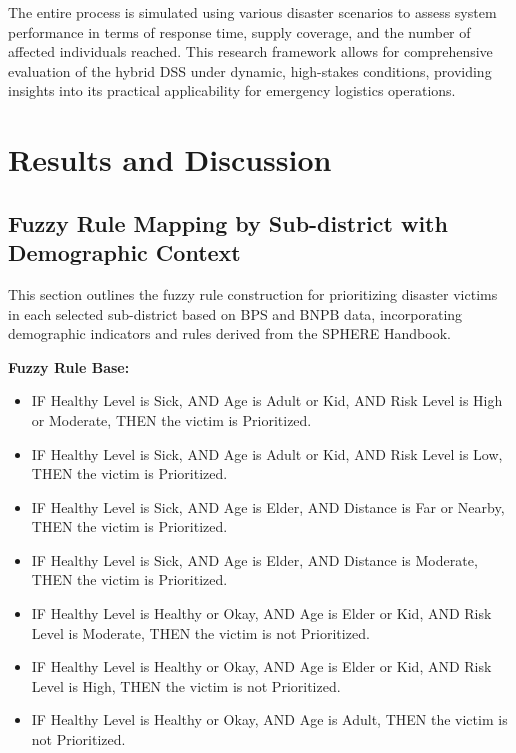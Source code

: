 \documentclass[journal,final,a4paper,twoside,11pt]{IEEEtran}
\begin{document}
The entire process is simulated using various disaster scenarios to assess system performance in terms of response time, supply coverage, and the number of affected individuals reached. This research framework allows for comprehensive evaluation of the hybrid DSS under dynamic, high-stakes conditions, providing insights into its practical applicability for emergency logistics operations.

\section{Results and Discussion}

\subsection*{Fuzzy Rule Mapping by Sub-district with Demographic Context}

This section outlines the fuzzy rule construction for prioritizing disaster victims in each selected sub-district based on BPS and BNPB data, incorporating demographic indicators and rules derived from the SPHERE Handbook.

\textbf{Fuzzy Rule Base:}
\begin{itemize}
    \item IF Healthy Level is Sick, AND Age is Adult or Kid, AND Risk Level is High or Moderate, THEN the victim is Prioritized.
    \item IF Healthy Level is Sick, AND Age is Adult or Kid, AND Risk Level is Low, THEN the victim is Prioritized.
    \item IF Healthy Level is Sick, AND Age is Elder, AND Distance is Far or Nearby, THEN the victim is Prioritized.
    \item IF Healthy Level is Sick, AND Age is Elder, AND Distance is Moderate, THEN the victim is Prioritized.
    \item IF Healthy Level is Healthy or Okay, AND Age is Elder or Kid, AND Risk Level is Moderate, THEN the victim is not Prioritized.
    \item IF Healthy Level is Healthy or Okay, AND Age is Elder or Kid, AND Risk Level is High, THEN the victim is not Prioritized.
    \item IF Healthy Level is Healthy or Okay, AND Age is Adult, THEN the victim is not Prioritized.
\end{itemize}
\end{document}
